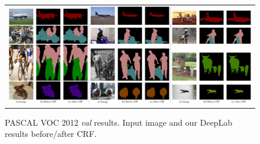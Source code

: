 


\begin{figure}[!htbp]
  \centering
  \scalebox{0.55} {
  \begin{tabular}{c}
    \includegraphics[width=1.8\linewidth]{fig/voc12_aspp/results.jpg}\\
  \end{tabular}
  }
  \caption{PASCAL VOC 2012 \textit{val} results. Input image
    and our DeepLab results before/after CRF.}
  \label{fig:ValResults}
\end{figure}


